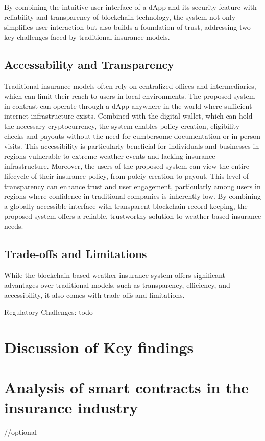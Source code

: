 By combining the intuitive user interface of a dApp and its security feature with reliability and transparency of blockchain technology, the system not only simplifies user interaction but also builds a foundation of trust, addressing two key challenges faced by traditional insurance models. 

\subsection{Accessability and Transparency}
Traditional insurance models often rely on centralized offices and intermediaries, which can limit their reach to users in local environments. The proposed system in contrast can operate through a dApp anywhere in the world where sufficient internet infrastructure exists. Combined with the digital wallet, which can hold the necessary cryptocurrency, the system enables policy creation, eligibility checks and payouts without the need for cumbersome documentation or in-person visits. This accessibility is particularly beneficial for individuals and businesses in regions vulnerable to extreme weather events and lacking insurance infrastructure. Moreover, the users of the proposed system can view the entire lifecycle of their insurance policy, from polciy creation to payout. This level of transparency can enhance trust and user engagement, particularly among users in regions where confidence in traditional companies is inherently low. By combining a globally accessible interface with transparent blockchain record-keeping, the proposed system offers a reliable, trustworthy solution to weather-based insurance needs.

\subsection{Trade-offs and Limitations}
While the blockchain-based weather insurance system offers significant advantages over traditional models, such as transparency, efficiency, and accessibility, it also comes with trade-offs and limitations.

Regulatory Challenges: todo

\section{Discussion of Key findings}

\section{Analysis of smart contracts in the insurance industry}\label{section:analysis_smart_contracts_insurance}
//optional

